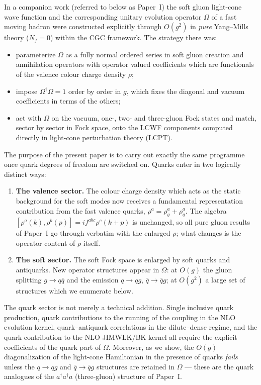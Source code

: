 \documentclass[11pt]{article}
\newcommand{\dg}{\dagger}
\newcommand{\OM}{\Omega}
\begin{document}
In a companion work (referred to below as Paper~I) the soft gluon light-cone wave function and the
corresponding unitary evolution operator $\OM$ of a fast moving hadron were constructed explicitly
through $O(g^2)$ in {\em pure} Yang--Mills theory ($N_f=0$) within the CGC framework. The strategy
there was:
\begin{itemize}
\item[(i)] parameterize $\OM$ as a fully normal ordered series in soft gluon creation and annihilation
operators with operator valued coefficients which are functionals of the valence colour charge
density $\rho$;
\item[(ii)] impose $\OM^\dg\OM=1$ order by order in $g$, which fixes the diagonal and vacuum
coefficients in terms of the others;
\item[(iii)] act with $\OM$ on the vacuum, one-, two- and three-gluon Fock states and match, sector
by sector in Fock space, onto the LCWF components computed directly in light-cone perturbation
theory (LCPT).
\end{itemize}
The purpose of the present paper is to carry out exactly the same programme once quark degrees of
freedom are switched on. Quarks enter in two logically distinct ways:

\begin{enumerate}
\item {\bf The valence sector.} The colour charge density which acts as the static background for
the soft modes now receives a fundamental representation contribution from the fast valence quarks,
$\rho^a=\rho^a_g+\rho^a_q$. The algebra $[\rho^a(k),\rho^b(p)]=if^{abc}\rho^c(k+p)$ is unchanged,
so all pure gluon results of Paper~I go through verbatim with the enlarged $\rho$; what changes is
the operator content of $\rho$ itself.
\item {\bf The soft sector.} The soft Fock space is enlarged by soft quarks and antiquarks. New
operator structures appear in $\OM$: at $O(g)$ the gluon splitting $g\to q\bar q$ and the emission
$q\to qg$, $\bar q\to\bar q g$; at $O(g^2)$ a large set of structures which we enumerate below.
\end{enumerate}

The quark sector is not merely a technical addition. Single inclusive quark production, quark
contributions to the running of the coupling in the NLO evolution kernel, quark--antiquark
correlations in the dilute--dense regime, and the quark contribution to the NLO JIMWLK/BK kernel
all require the explicit coefficients of the quark part of $\OM$. Moreover, as we show, the $O(g)$
diagonalization of the light-cone Hamiltonian in the presence of quarks {\em fails} unless the
$q\to qg$ and $\bar q\to \bar q g$ structures are retained in $\OM$ --- these are the quark
analogues of the $a^\dg a^\dg a$ (three-gluon) structure of Paper~I.
\end{document}
